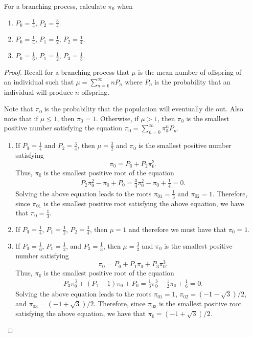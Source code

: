 \begin{problem}{4.66}
  For a branching process, calculate $\pi_0$ when
  \begin{enumerate}
    \item $P_0 = \frac{1}{4}$, $P_2 = \frac{3}{4}$.
    \item $P_0 = \frac{1}{4}$, $P_1 = \frac{1}{2}$, $P_2 = \frac{1}{4}$.
    \item $P_0 = \frac{1}{6}$, $P_1 = \frac{1}{2}$, $P_3 = \frac{1}{3}$.
  \end{enumerate}
\end{problem}

\begin{proof}
  Recall for a branching process that $\mu$ is the mean number of offspring of an individual such that
  $\mu = \sum_{n=0}^\infty n P_n$ where $P_n$ is the probability that an individual will
  produce $n$ offspring.

  Note that $\pi_0$ is the probability that the population will eventually die out.
  Also note that if $\mu \leq 1$, then $\pi_0 = 1$. Otherwise, if $\mu > 1$, then
  $\pi_0$ is the smallest positive number satisfying the equation $\pi_0 = \sum_{n=0}^\infty \pi_0^n P_n.$

  \begin{enumerate}
    \item If $P_0 = \frac{1}{4}$ and  $P_2 = \frac{3}{4}$, then $\mu = \frac{3}{2}$ and $\pi_0$
      is the smallest positive number satisfying
      $$\pi_0 = P_0 + P_2 \pi_0^2.$$
      Thus, $\pi_0$ is the smallest positive root of the equation
      \begin{align*}
        P_2\pi_0^2 - \pi_0 + P_0 = \frac{3}{4}\pi_0^2 - \pi_0 + \frac{1}{4}=0.
      \end{align*}
      Solving the above equation leads to the roots $\pi_{01} = \frac{1}{3}$ and $\pi_{02} = 1$.
      Therefore, since $\pi_{01}$ is the smallest positive root satisfying the above equation, we have that
      $\pi_0 = \frac{1}{3}$.

    \item If $P_0 = \frac{1}{4}$, $P_1 = \frac{1}{2}$, $P_2 = \frac{1}{4}$,
      then $\mu = 1$ and therefore we must have that $\pi_0 = 1$.

    \item If $P_0 = \frac{1}{6}$, $P_1 = \frac{1}{2}$, and $P_3 = \frac{1}{3}$,
      then $\mu = \frac{3}{2}$ and $\pi_0$ is the smallest positive number
      satisfying
      $$\pi_0 = P_0 + P_1 \pi_0 + P_3 \pi_0^3.$$
      Thus, $\pi_0$ is the smallest positive root of the equation
      \begin{align*}
        P_3\pi_0^3 + (P_1- 1)\pi_0 + P_0 = \frac{1}{3}\pi_0^3 -\frac{1}{2} \pi_0 + \frac{1}{6}=0.
      \end{align*}
      Solving the above equation leads to the roots $\pi_{01} = 1$, $\pi_{02} = (-1 - \sqrt{3})/2$,
      and $\pi_{03} = (-1 + \sqrt{3})/2$.
      Therefore, since $\pi_{03}$ is the smallest positive root satisfying the above equation, we have that
      $\pi_0 =  (-1 + \sqrt{3})/2$.
  \end{enumerate}
\end{proof}
\newpage
